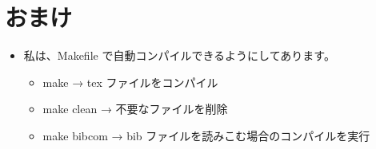 \documentclass[11pt,a4paper,xdvipdfmx]{article}
\begin{document}
\section{おまけ}
\label{sec-5}
\begin{itemize}
\item 私は、Makefile で自動コンパイルできるようにしてあります。
\begin{itemize}
\item make → tex ファイルをコンパイル
\item make clean → 不要なファイルを削除
\item make bibcom → bib ファイルを読みこむ場合のコンパイルを実行
\end{itemize}
\end{itemize}
\end{document}
